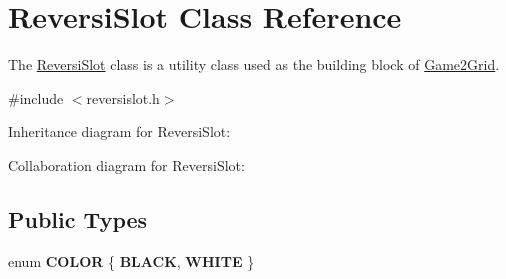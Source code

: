 \hypertarget{classReversiSlot}{}\section{Reversi\+Slot Class Reference}
\label{classReversiSlot}


The \hyperlink{classReversiSlot}{Reversi\+Slot} class is a utility class used as the building block of \hyperlink{classGame2Grid}{Game2\+Grid}.  




{\ttfamily \#include $<$reversislot.\+h$>$}



Inheritance diagram for Reversi\+Slot\+:


Collaboration diagram for Reversi\+Slot\+:
\subsection*{Public Types}
\begin{DoxyCompactItemize}
\item 
\mbox{\label{classReversiSlot_a44e0d424583c24d6c929d717efe532c7}} 
enum {\bfseries C\+O\+L\+OR} \{ {\bfseries B\+L\+A\+CK}, 
{\bfseries W\+H\+I\+TE}
 \}
\end{DoxyCompactItemize}
